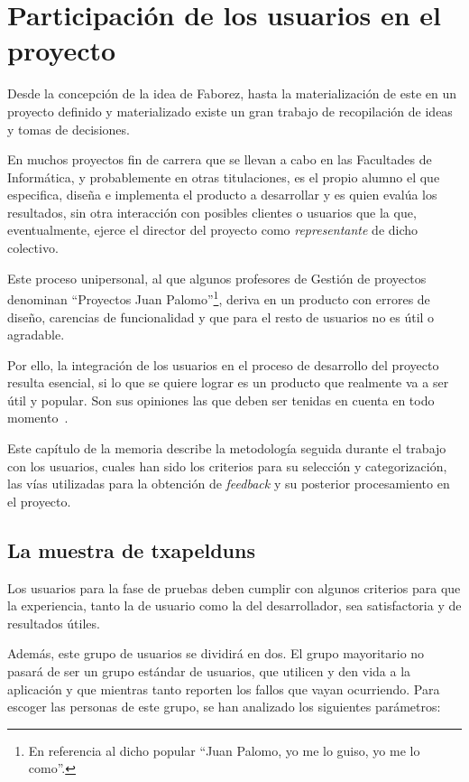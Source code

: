 \documentclass[main]{subfiles}
\begin{document}
\chapter{Participación de los usuarios en el proyecto}
\label{sec:txapeldunes}

Desde la concepción de la idea de Faborez, hasta la materialización de este en un proyecto definido y materializado existe un gran trabajo de recopilación de ideas y tomas de decisiones.

En muchos proyectos fin de carrera que se llevan a cabo en las Facultades de Informática, y probablemente en otras titulaciones, es el propio alumno el que especifica, diseña e implementa el producto a desarrollar y es quien evalúa los resultados, sin otra interacción con posibles clientes o usuarios que la que, eventualmente, ejerce el director del proyecto como \emph{representante} de dicho colectivo.

Este proceso unipersonal, al que algunos profesores de Gestión de proyectos denominan \enquote{Proyectos Juan Palomo}\footnote{En referencia al dicho popular \enquote{Juan Palomo, yo me lo guiso, yo me lo como}.}, deriva en un producto con errores de diseño, carencias de funcionalidad y que para el resto de usuarios no es útil o agradable.

Por ello, la integración de los usuarios en el proceso de desarrollo del proyecto resulta esencial, si lo que se quiere lograr es un producto que realmente va a ser útil y popular. Son sus opiniones las que deben ser tenidas en cuenta en todo momento~\autocite{mikelnino:clientes}.

Este capítulo de la memoria describe la metodología seguida durante el trabajo con los usuarios, cuales han sido los criterios para su selección y categorización, las vías utilizadas para la obtención de \emph{feedback} y su posterior procesamiento en el proyecto.

\section[La muestra de txapeldunes]{La muestra de \glspl{txapeldun}}

Los usuarios para la fase de pruebas deben cumplir con algunos criterios para que la experiencia, tanto la de usuario como la del desarrollador, sea satisfactoria y de resultados útiles.

Además, este grupo de usuarios se dividirá en dos. El grupo mayoritario no pasará de ser un grupo estándar de usuarios, que utilicen y den vida a la aplicación y que mientras tanto reporten los fallos que vayan ocurriendo. Para escoger las personas de este grupo, se han analizado los siguientes parámetros:
\end{document}
